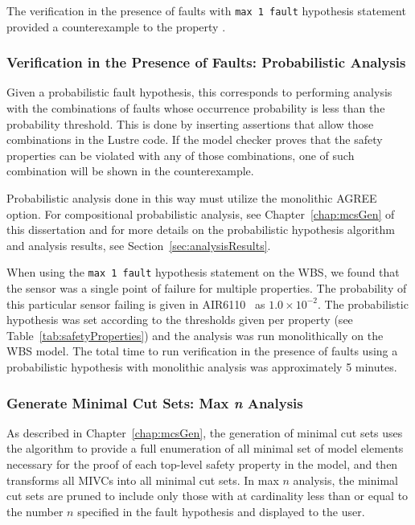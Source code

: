 The verification in the presence of faults with \texttt{max 1 fault} hypothesis statement  provided a counterexample to the property {\em }. 

\subsubsection{Verification in the Presence of Faults: Probabilistic Analysis} 
Given a probabilistic fault hypothesis, this corresponds to performing analysis with the combinations of faults whose occurrence probability is less than the probability threshold. This is done by inserting assertions that allow those combinations in the Lustre code. If the model checker proves that the safety properties can be violated with any of those combinations, one of such combination will be shown in the counterexample. 

Probabilistic analysis done in this way must utilize the monolithic AGREE option. For compositional probabilistic analysis, see Chapter~\ref{chap:mcsGen} of this dissertation and for more details on the probabilistic hypothesis algorithm and analysis results, see Section~\ref{sec:analysisResults}. 

When using the \texttt{max 1 fault} hypothesis statement on the WBS, we found that the sensor was a single point of failure for multiple properties. The probability of this particular sensor failing is given in AIR6110~\cite{tab:safetyProperties} as $1.0 \times 10^{-2}$. The probabilistic hypothesis was set according to the thresholds given per property (see Table~\ref{tab:safetyProperties}) and the analysis was run monolithically on the WBS model. The total time to run verification in the presence of faults using a probabilistic hypothesis with monolithic analysis was approximately 5 minutes. 


\subsubsection{Generate Minimal Cut Sets: Max \textit{n} Analysis}
\label{sec:maxN_generate}
As described in Chapter~\ref{chap:mcsGen}, the generation of minimal cut sets uses the \aivcalg algorithm to provide a full enumeration of all minimal set of model elements necessary for the proof of each top-level safety property in the model, and then transforms all MIVCs into all minimal cut sets. In max $n$ analysis, the minimal cut sets are pruned to include only those with at cardinality less than or equal to the number $n$ specified in the fault hypothesis and displayed to the user.


